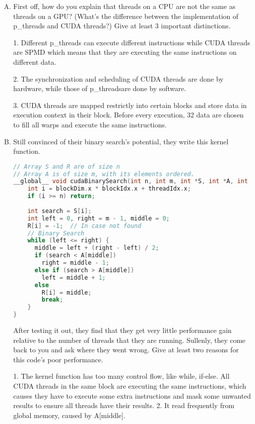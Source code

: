 \documentclass[11pt]{article}
\newenvironment{choice}{\begin{enumerate}[A.]}{\end{enumerate}}
\newenvironment{answer}{\begin{minipage}[c][1.5in]{\textwidth}}{\end{minipage}}
\begin{document}
\begin{choice}
\item
First off, how do you explain that
threads on a CPU are not the same as threads on a GPU? (What's the
difference between the implementation of p\_threads and CUDA threads?)
Give at least 3 important distinctions.


\begin{answer}
1. Different p\_threads can execute different instructions while CUDA threads are SPMD which
means that they are executing the same instructions on different data. 

2. The synchronization and scheduling of CUDA threads are done by hardware, while those of 
p\_threadsare done by software. 

3. CUDA threads are mapped restrictly into certain blocks and store data in execution context
in their block. Before every execution, 32 data are chosen to fill all warps and execute the 
same instructions. 


\end{answer}

\item
Still convinced of their binary search's potential, they write this kernel function.

\begin{lstlisting}[language=C,basicstyle=\ttfamily]
// Array S and R are of size n
// Array A is of size m, with its elements ordered.
__global__ void cudaBinarySearch(int n, int m, int *S, int *A, int *R) {
    int i = blockDim.x * blockIdx.x + threadIdx.x;
    if (i >= n) return;
    
    int search = S[i];
    int left = 0, right = m - 1, middle = 0;
    R[i] = -1;  // In case not found
    // Binary Search
    while (left <= right) {
      middle = left + (right - left) / 2;      
      if (search < A[middle])
        right = middle - 1;
      else if (search > A[middle])
        left = middle + 1;
      else
        R[i] = middle;
        break;
    }
}
\end{lstlisting}

After testing it out, they find that they get very little performance
gain relative to the number of threads that they are running. Sullenly,
they come back to you and ask where they went wrong. Give at least
two reasons for this code's poor performance.

\begin{answer}
1. The kernel function has too many control flow, like while, if-else. All CUDA threads in
the same block are executing the same instructions, which causes they have to execute some extra
instructions and mask some unwanted results to ensure all threads have their results. 
2. It read frequently from global memory, caused by A[middle]. 
\end{answer}
\end{choice}
\end{document}
